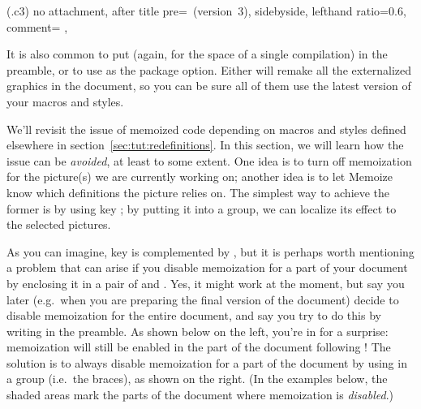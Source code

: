 \documentclass[a4paper,11pt]{article}
\begin{document}
(.c3){
  no attachment,
  after title pre={\ (version~3)},
  sidebyside, lefthand ratio=0.6,
  comment={\centering
  },
}

It is also common to put (again, for the space of a single compilation)
 in the preamble, or to use
 as the package option.  Either will remake all the
externalized graphics in the document, so you can be sure all of them use the
latest version of your macros and styles.

We'll revisit the issue of memoized code depending on macros and styles defined
elsewhere in section~\ref{sec:tut:redefinitions}.  In this section, we will
learn how the issue can be \emph{avoided}, at least to some extent.  One idea
is to turn off memoization for the picture(s) we are currently working on;
another idea is to let Memoize know which definitions the picture relies on.
The simplest way to achieve the former is by using key ;
by putting it into a  group, we can localize its effect to the
selected pictures.


\begin{tcolorbox}[warning]
  As you can imagine, key  is complemented by ,
  but it is perhaps worth mentioning a problem that can arise if you disable
  memoization for a part of your document by enclosing it in a pair of
   and
  .  Yes, it might work at the moment,
  but say you later (e.g.\ when you are preparing the final version of the
  document) decide to disable memoization for the entire document, and say you
  try to do this by writing  in the
  preamble.  As shown below on the left, you're in for a surprise: memoization
  will still be enabled in the part of the document following
  !  The solution is to always disable
  memoization for a part of the document by using
   in a  group (i.e.\ the
  braces), as shown on the right.  (In the examples below, the shaded areas
  mark the parts of the document where memoization is \emph{disabled}.)
\end{tcolorbox}
\end{document}
